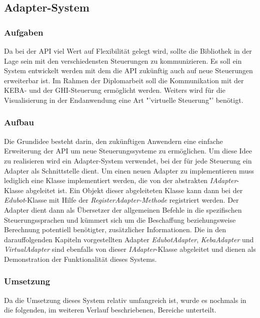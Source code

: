 
\subsection{Adapter-System}

\subsubsection{Aufgaben}
Da bei der API viel Wert auf Flexibilität gelegt wird, sollte die Bibliothek in der Lage sein mit den verschiedensten Steuerungen zu kommunizieren. Es soll ein System entwickelt werden mit dem die API zukünftig auch auf neue Steuerungen erweiterbar ist. Im Rahmen der Diplomarbeit soll die Kommunikation mit der KEBA- und der GHI-Steuerung ermöglicht werden. Weiters wird für die Visualisierung in der Endanwendung eine Art "'virtuelle Steuerung"' benötigt.

\subsubsection{Aufbau}
Die Grundidee besteht darin, den zukünftigen Anwendern eine einfache Erweiterung der API um neue Steuerungssysteme zu ermöglichen. Um diese Idee zu realisieren wird ein Adapter-System verwendet, bei der für jede Steuerung ein Adapter als Schnittstelle dient. Um einen neuen Adapter zu implementieren muss lediglich eine Klasse implementiert werden, die von der abstrakten \textit{IAdapter}-Klasse abgeleitet ist. Ein Objekt dieser abgeleiteten Klasse kann dann bei der \textit{Edubot}-Klasse mit Hilfe der \textit{RegisterAdapter-Methode} registriert werden. Der Adapter dient dann als Übersetzer der allgemeinen Befehle in die spezifischen Steuerungssprachen und kümmert sich um die Beschaffung beziehungsweise Berechnung potentiell benötigter, zusätzlicher Informationen. Die in den darauffolgenden Kapiteln vorgestellten Adapter  \textit{EdubotAdapter}, \textit{KebaAdapter} und \textit{VirtualAdapter} sind ebenfalls von dieser \textit{IAdapter}-Klasse abgeleitet und dienen als Demonstration der Funktionalität dieses Systems. 

\subsubsection{Umsetzung}

Da die Umsetzung dieses System relativ umfangreich ist, wurde es nochmals in die folgenden, im weiteren Verlauf beschriebenen, Bereiche unterteilt.\\

